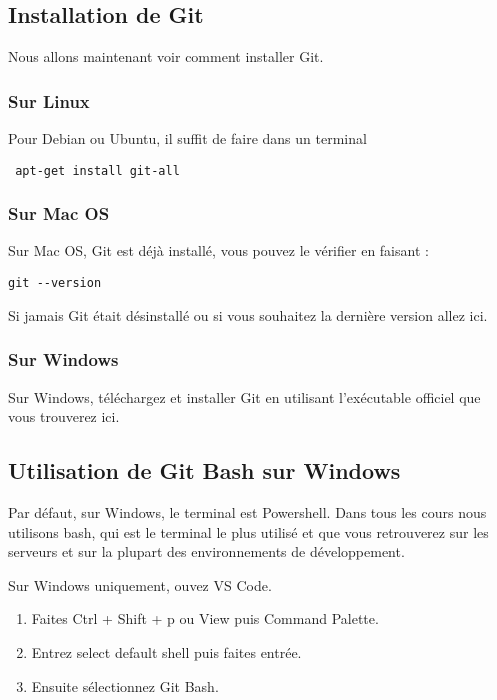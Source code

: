 \documentclass{article}
\begin{document}
\subsection{Installation de {\color{blue}Git}}
Nous allons maintenant voir comment installer {\color{blue}Git}.

\subsubsection*{Sur {\color{blue}Linux}}
Pour {\color{blue}Debian} ou {\color{blue}Ubuntu}, il suffit de faire dans un terminal

\begin{verbatim}
 apt-get install git-all
\end{verbatim}


\subsubsection*{Sur {\color{blue}Mac OS}}
Sur Mac OS, Git est déjà installé, vous pouvez le vérifier en faisant :
\begin{verbatim}
git --version
\end{verbatim}

Si jamais {\color{blue}Git} était désinstallé ou si vous souhaitez la dernière version allez {\color{blue}ici}.

\subsubsection*{Sur {\color{blue}Windows}}
Sur {\color{blue}Windows}, téléchargez et installer {\color{blue}Git} en utilisant l'exécutable officiel que vous trouverez ici.

\subsection{Utilisation de {\color{blue}Git Bash} sur {\color{blue}Windows}}
Par défaut, sur {\color{blue}Windows}, le terminal est {\color{blue}Powershell}. Dans tous les cours nous utilisons {\color{blue}bash}, qui est le terminal le plus utilisé et que vous retrouverez sur les serveurs et sur la plupart des environnements de développement.

Sur {\color{blue}Windows} uniquement, ouvez {\color{blue}VS Code}. 
\begin{enumerate}
\item Faites {\color{blue}Ctrl + Shift + p} ou {\color{blue}View} puis {\color{blue}Command Palette}.
\item Entrez {\color{blue}select default shell} puis faites entrée.
\item Ensuite sélectionnez {\color{blue}Git Bash}.
\end{enumerate}
\end{document}

